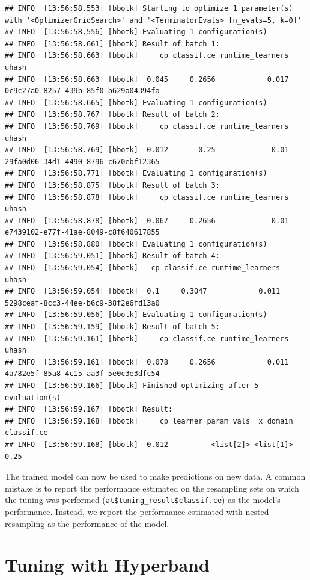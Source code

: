 \documentclass[
]{scrbook}
\begin{document}
\begin{verbatim}
## INFO  [13:56:58.553] [bbotk] Starting to optimize 1 parameter(s) with '<OptimizerGridSearch>' and '<TerminatorEvals> [n_evals=5, k=0]' 
## INFO  [13:56:58.556] [bbotk] Evaluating 1 configuration(s) 
## INFO  [13:56:58.661] [bbotk] Result of batch 1: 
## INFO  [13:56:58.663] [bbotk]     cp classif.ce runtime_learners                                uhash 
## INFO  [13:56:58.663] [bbotk]  0.045     0.2656            0.017 0c9c27a0-8257-439b-85f0-b629a04394fa 
## INFO  [13:56:58.665] [bbotk] Evaluating 1 configuration(s) 
## INFO  [13:56:58.767] [bbotk] Result of batch 2: 
## INFO  [13:56:58.769] [bbotk]     cp classif.ce runtime_learners                                uhash 
## INFO  [13:56:58.769] [bbotk]  0.012       0.25             0.01 29fa0d06-34d1-4490-8796-c670ebf12365 
## INFO  [13:56:58.771] [bbotk] Evaluating 1 configuration(s) 
## INFO  [13:56:58.875] [bbotk] Result of batch 3: 
## INFO  [13:56:58.878] [bbotk]     cp classif.ce runtime_learners                                uhash 
## INFO  [13:56:58.878] [bbotk]  0.067     0.2656             0.01 e7439102-e77f-41ae-8049-c8f640617855 
## INFO  [13:56:58.880] [bbotk] Evaluating 1 configuration(s) 
## INFO  [13:56:59.051] [bbotk] Result of batch 4: 
## INFO  [13:56:59.054] [bbotk]   cp classif.ce runtime_learners                                uhash 
## INFO  [13:56:59.054] [bbotk]  0.1     0.3047            0.011 5298ceaf-8cc3-44ee-b6c9-38f2e6fd13a0 
## INFO  [13:56:59.056] [bbotk] Evaluating 1 configuration(s) 
## INFO  [13:56:59.159] [bbotk] Result of batch 5: 
## INFO  [13:56:59.161] [bbotk]     cp classif.ce runtime_learners                                uhash 
## INFO  [13:56:59.161] [bbotk]  0.078     0.2656            0.011 4a782e5f-85a8-4c15-aa3f-5e0c3e3dfc54 
## INFO  [13:56:59.166] [bbotk] Finished optimizing after 5 evaluation(s) 
## INFO  [13:56:59.167] [bbotk] Result: 
## INFO  [13:56:59.168] [bbotk]     cp learner_param_vals  x_domain classif.ce 
## INFO  [13:56:59.168] [bbotk]  0.012          <list[2]> <list[1]>       0.25
\end{verbatim}

The trained model can now be used to make predictions on new data.
A common mistake is to report the performance estimated on the resampling sets on which the tuning was performed (\texttt{at\$tuning\_result\$classif.ce}) as the model's performance.
Instead, we report the performance estimated with nested resampling as the performance of the model.

\hypertarget{hyperband}{%
\section{Tuning with Hyperband}\label{hyperband}}
\end{document}
